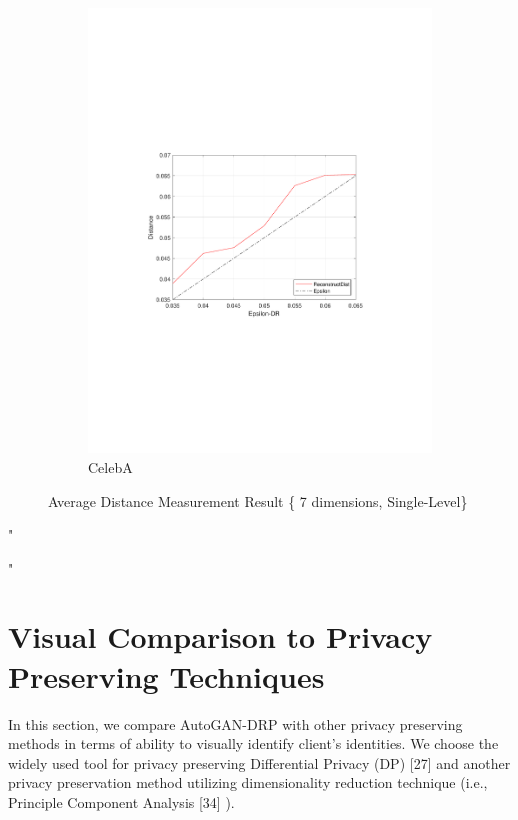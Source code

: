 \begin{figure}[ht!]
\begin{subfigure}{.33\textwidth}
		\includegraphics[width=\linewidth, trim=3.8cm 8cm 4cm 8cm, clip=true]{figures/ep_celeba}
		\captionsetup{justification=centering}
		\caption{CelebA}
		\label{fig:celeba_dist}
	\end{subfigure}
	\caption{Average Distance Measurement Result \{ 7 dimensions, Single-Level\}}
	\label{fig:distresult}
\end{figure}
"


\setcounter{section}{5} "
\section{Visual Comparison to Privacy Preserving Techniques }
\label{AutoGAN_DP_PCA}

In this section, we compare AutoGAN-DRP with other privacy preserving methods in terms of ability to visually identify client's identities. We choose the widely used tool for privacy preserving Differential Privacy (DP) [27] and another privacy preservation method utilizing dimensionality reduction technique (i.e., Principle Component Analysis [34] ).

